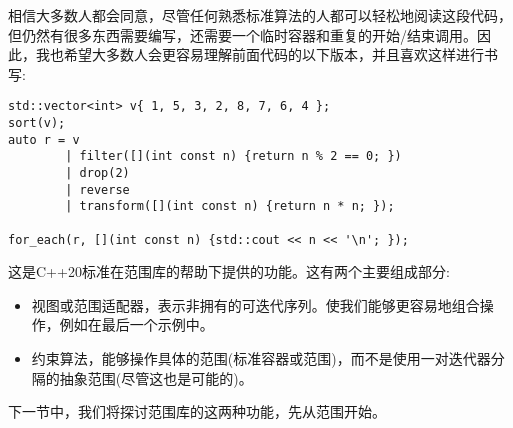 相信大多数人都会同意，尽管任何熟悉标准算法的人都可以轻松地阅读这段代码，但仍然有很多东西需要编写，还需要一个临时容器和重复的开始/结束调用。因此，我也希望大多数人会更容易理解前面代码的以下版本，并且喜欢这样进行书写:

\begin{lstlisting}[style=styleCXX]
std::vector<int> v{ 1, 5, 3, 2, 8, 7, 6, 4 };
sort(v);
auto r = v
		| filter([](int const n) {return n % 2 == 0; })
		| drop(2)
		| reverse
		| transform([](int const n) {return n * n; });
		
for_each(r, [](int const n) {std::cout << n << '\n'; });
\end{lstlisting}

这是C++20标准在范围库的帮助下提供的功能。这有两个主要组成部分:

\begin{itemize}
\item
视图或范围适配器，表示非拥有的可迭代序列。使我们能够更容易地组合操作，例如在最后一个示例中。

\item
约束算法，能够操作具体的范围(标准容器或范围)，而不是使用一对迭代器分隔的抽象范围(尽管这也是可能的)。
\end{itemize}

下一节中，我们将探讨范围库的这两种功能，先从范围开始。

